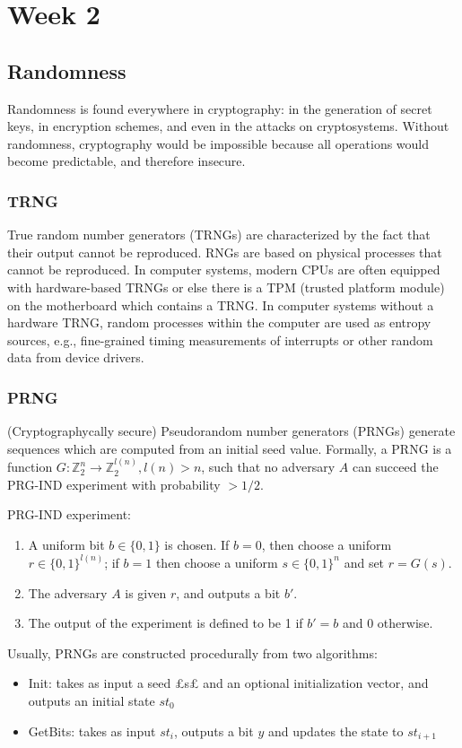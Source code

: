 \documentclass{article}
\theoremstyle{mytheoremstyle}
\begin{document}
    \section{Week 2}
    \subsection{Randomness}
    Randomness is found everywhere in cryptography: in the generation of secret keys, in encryption schemes, and even in the attacks on cryptosystems. Without randomness, cryptography would be impossible because all operations would become predictable, and therefore insecure.
    \subsubsection{TRNG}
    True random number generators (TRNGs) are characterized by the fact that their output cannot be reproduced. RNGs are based on physical processes that cannot be reproduced. In computer systems, modern CPUs are often equipped with hardware-based TRNGs or else there is a TPM (trusted platform module) on the motherboard which contains a TRNG. In computer systems without a hardware TRNG, random processes within the computer are used as entropy sources, e.g., fine-grained timing measurements of interrupts or other random data from device drivers.
    \subsubsection{PRNG}
    (Cryptographycally secure) Pseudorandom number generators (PRNGs) generate sequences which are computed from an initial seed value. Formally, a PRNG is a function $G:\mathbb{Z}^n_2\rightarrow\mathbb{Z}^{l(n)}_2, l(n)>n$, such that no adversary $A$ can succeed the PRG-IND experiment with probability $>1/2$.

    PRG-IND experiment:
    \begin{enumerate}
        \item A uniform bit $b\in\{0,1\}$ is chosen. If $b=0$, then choose a uniform $r\in\{0,1\}^{l(n)}$; if $b=1$ then choose a uniform $s\in\{0,1\}^n$ and set $r=G(s)$.
        \item The adversary $A$ is given $r$, and outputs a bit $b'$.
        \item The output of the experiment is defined to be 1 if $b'=b$ and 0 otherwise.
    \end{enumerate}
    
    Usually, PRNGs are constructed procedurally from two algorithms:
    \begin{itemize}
        \item Init: takes as input a seed £s£ and an optional initialization vector, and outputs an initial state $st_0$
        \item GetBits: takes as input $st_i$, outputs a bit $y$ and updates the state to $st_{i+1}$
    \end{itemize}
\end{document}
